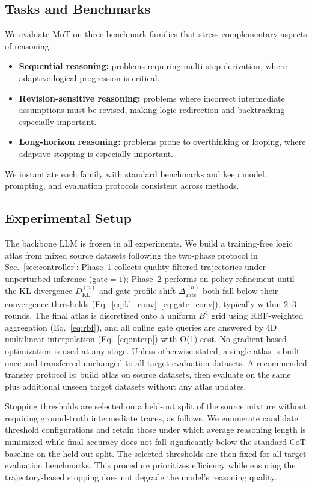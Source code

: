 \documentclass{article}
\begin{document}
\subsection{Tasks and Benchmarks}
We evaluate MoT on three benchmark families that stress complementary aspects of reasoning:
\begin{itemize}[leftmargin=1.3em, itemsep=0.2em]
    \item \textbf{Sequential reasoning:} problems requiring multi-step derivation, where adaptive logical progression is critical.
    \item \textbf{Revision-sensitive reasoning:} problems where incorrect intermediate assumptions must be revised, making logic redirection and backtracking especially important.
    \item \textbf{Long-horizon reasoning:} problems prone to overthinking or looping, where adaptive stopping is especially important.
\end{itemize}
We instantiate each family with standard benchmarks and keep model, prompting, and evaluation protocols consistent across methods.

\subsection{Experimental Setup}
The backbone LLM is frozen in all experiments. We build a training-free logic atlas from mixed source datasets following the two-phase protocol in Sec.~\ref{sec:controller}: Phase~1 collects quality-filtered trajectories under unperturbed inference (gate$=1$); Phase~2 performs on-policy refinement until the KL divergence $D^{(n)}_{\mathrm{KL}}$ and gate-profile shift $\Delta^{(n)}_{\mathrm{gate}}$ both fall below their convergence thresholds (Eq.~\eqref{eq:kl_conv}--\eqref{eq:gate_conv}), typically within 2--3 rounds. The final atlas is discretized onto a uniform $B^4$ grid using RBF-weighted aggregation (Eq.~\eqref{eq:rbf}), and all online gate queries are answered by 4D multilinear interpolation (Eq.~\eqref{eq:interp}) with O(1) cost. No gradient-based optimization is used at any stage. Unless otherwise stated, a single atlas is built once and transferred unchanged to all target evaluation datasets. A recommended transfer protocol is: build atlas on source datasets, then evaluate on the same plus additional unseen target datasets without any atlas updates.

Stopping thresholds are selected on a held-out split of the source mixture without requiring ground-truth intermediate traces, as follows. We enumerate candidate threshold configurations and retain those under which average reasoning length is minimized while final accuracy does not fall significantly below the standard CoT baseline on the held-out split. The selected thresholds are then fixed for all target evaluation benchmarks. This procedure prioritizes efficiency while ensuring the trajectory-based stopping does not degrade the model's reasoning quality.
\end{document}
